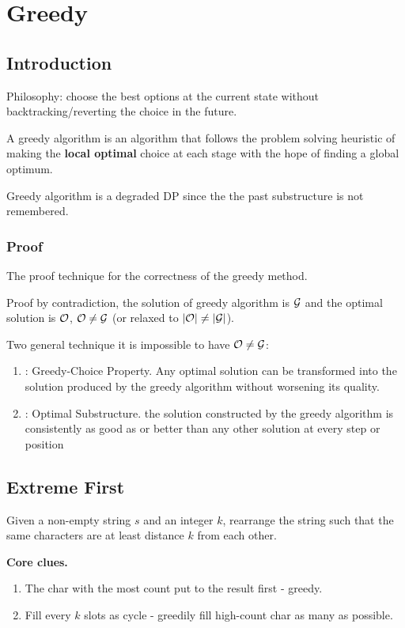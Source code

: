 \chapter{Greedy}

\section{Introduction}
Philosophy: choose the best options at the current state without backtracking/reverting the choice in the future. 

A greedy algorithm is an algorithm that follows the problem solving heuristic of making the \textbf{local optimal} choice at each stage with the hope of finding a global optimum.

Greedy algorithm is a degraded DP since the the past substructure is not remembered.

\subsection{Proof}
The proof technique for the correctness of the greedy method. 

Proof by contradiction, the solution of greedy algorithm is $\mathcal{G}$ and the optimal solution is $\mathcal{O}$, $\mathcal{O}\neq \mathcal{G}$ (or relaxed to $|\mathcal{O}|\neq |\mathcal{G}|$). 

Two general technique it is impossible to have $\mathcal{O}\neq \mathcal{G}$:
\begin{enumerate}
\item {}: Greedy-Choice Property. Any optimal solution can be transformed into the solution produced by the greedy algorithm without worsening its quality.  
\item {}: Optimal Substructure. the solution constructed by the greedy algorithm is consistently as good as or better than any other solution at every step or position
\end{enumerate}

\section{Extreme First}
 Given a non-empty string $s$ and an integer $k$, rearrange the string such that the same characters are at least distance
$k$ from each other.

\textbf{Core clues.} 
\begin{enumerate}
\item The char with the most count put to the result first - greedy.
\item Fill every $k$ slots as cycle - greedily fill high-count char as many as possible.
\end{enumerate}

